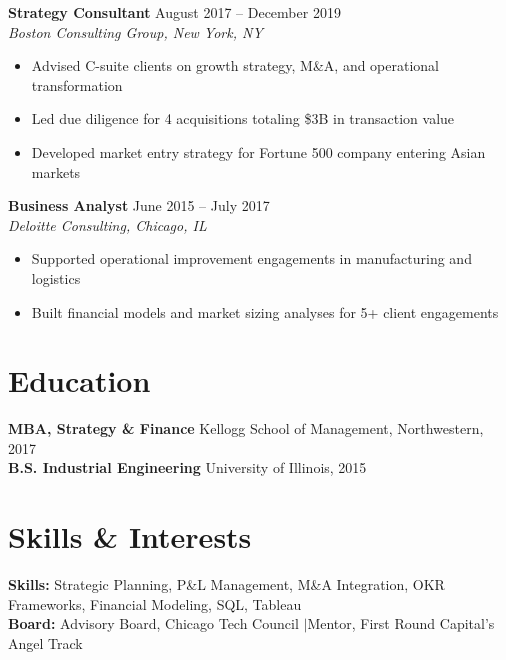 \documentclass[11pt,a4paper]{article}
\begin{document}
\noindent\textbf{Strategy Consultant} \hfill August 2017 -- December 2019\\
\textit{Boston Consulting Group, New York, NY}
\begin{itemize}[leftmargin=1.5em,nosep,label={\color{accent}\textendash}]
\item Advised C-suite clients on growth strategy, M\&A, and operational transformation
\item Led due diligence for 4 acquisitions totaling \$3B in transaction value
\item Developed market entry strategy for Fortune 500 company entering Asian markets
\end{itemize}
\vspace{0.5em}

\noindent\textbf{Business Analyst} \hfill June 2015 -- July 2017\\
\textit{Deloitte Consulting, Chicago, IL}
\begin{itemize}[leftmargin=1.5em,nosep,label={\color{accent}\textendash}]
\item Supported operational improvement engagements in manufacturing and logistics
\item Built financial models and market sizing analyses for 5+ client engagements
\end{itemize}

\section{Education}
\noindent\textbf{MBA, Strategy \& Finance} \hfill Kellogg School of Management, Northwestern, 2017\\
\textbf{B.S. Industrial Engineering} \hfill University of Illinois, 2015

\section{Skills \& Interests}
\noindent\textbf{Skills:} Strategic Planning, P\&L Management, M\&A Integration, OKR Frameworks, Financial Modeling, SQL, Tableau\\
\textbf{Board:} Advisory Board, Chicago Tech Council \quad$\vert$\quad Mentor, First Round Capital's Angel Track
\end{document}
